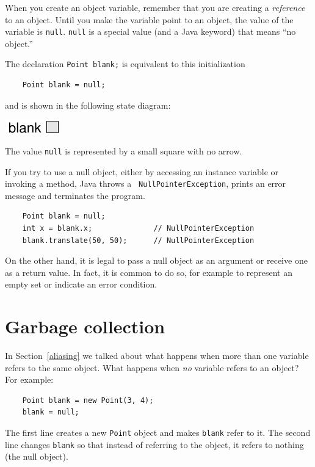 \documentclass[12pt]{book}
\theoremstyle{exercise}
\begin{document}
When you create an object variable, remember that you are
creating a {\em reference} to an object.  Until you make
the variable point to an object, the value of the variable
is {\tt null}.  {\tt null} is a special value (and
a Java keyword) that means ``no object.''

The declaration {\tt Point blank;} is equivalent to this
initialization

\begin{lstlisting}
    Point blank = null;
\end{lstlisting}
%
and is shown in the following state diagram:


\includegraphics{figs/reference2.pdf}


The value {\tt null} is represented by a small square with no arrow.


If you try to use a null object, either by accessing an instance
variable or invoking a method, Java throws a {\tt
NullPointerException}, prints an error message
and terminates the program.

\begin{lstlisting}
    Point blank = null;
    int x = blank.x;              // NullPointerException
    blank.translate(50, 50);      // NullPointerException
\end{lstlisting}
%
On the other hand, it is legal to pass a null object as an argument or
receive one as a return value.  In fact, it is common to do so, for
example to represent an empty set or indicate an error condition.


\section {Garbage collection}

In Section~\ref{aliasing} we talked about what happens when
more than one variable refers to the same object.  What happens
when {\em no} variable refers to an object?  For example:

\begin{lstlisting}
    Point blank = new Point(3, 4);
    blank = null;
\end{lstlisting}
%
The first line creates a new {\tt Point} object and makes
{\tt blank} refer to it.  The second line changes {\tt blank}
so that instead of referring to the object, it refers to
nothing (the null object).
\end{document}
